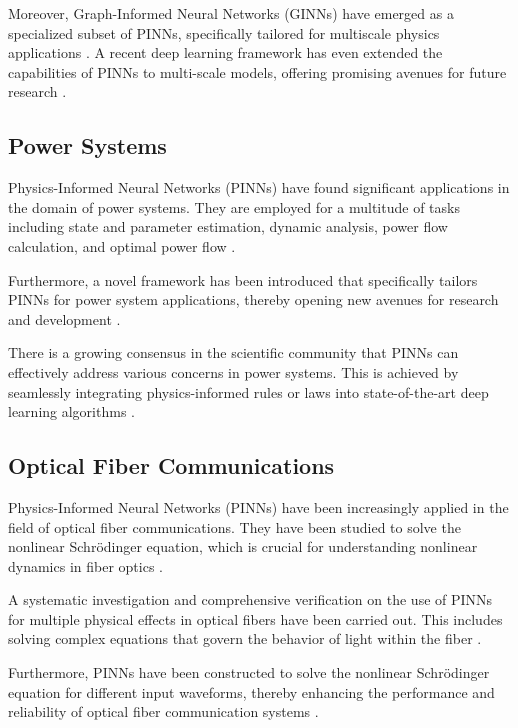 \documentclass[12pt]{article}
\begin{document}
	Moreover, Graph-Informed Neural Networks (GINNs) have emerged as a specialized subset of PINNs, specifically tailored for multiscale physics applications \cite{sciencedirect-ginns}. A recent deep learning framework has even extended the capabilities of PINNs to multi-scale models, offering promising avenues for future research \cite{arxiv-multiscale-models}.
		
	\subsection{Power Systems}
	Physics-Informed Neural Networks (PINNs) have found significant applications in the domain of power systems. They are employed for a multitude of tasks including state and parameter estimation, dynamic analysis, power flow calculation, and optimal power flow \cite{ieee-xplore1}.
	
	Furthermore, a novel framework has been introduced that specifically tailors PINNs for power system applications, thereby opening new avenues for research and development \cite{ieee-xplore2}.
	
	There is a growing consensus in the scientific community that PINNs can effectively address various concerns in power systems. This is achieved by seamlessly integrating physics-informed rules or laws into state-of-the-art deep learning algorithms \cite{ieee-xplore1}.
	
	
	
	\subsection{Optical Fiber Communications}
	Physics-Informed Neural Networks (PINNs) have been increasingly applied in the field of optical fiber communications. They have been studied to solve the nonlinear Schrödinger equation, which is crucial for understanding nonlinear dynamics in fiber optics \cite{researchgate-optical}.
	
	A systematic investigation and comprehensive verification on the use of PINNs for multiple physical effects in optical fibers have been carried out. This includes solving complex equations that govern the behavior of light within the fiber \cite{wiley-optical}.
	
	Furthermore, PINNs have been constructed to solve the nonlinear Schrödinger equation for different input waveforms, thereby enhancing the performance and reliability of optical fiber communication systems \cite{ieee-xplore-optical}.
		
\end{document}
